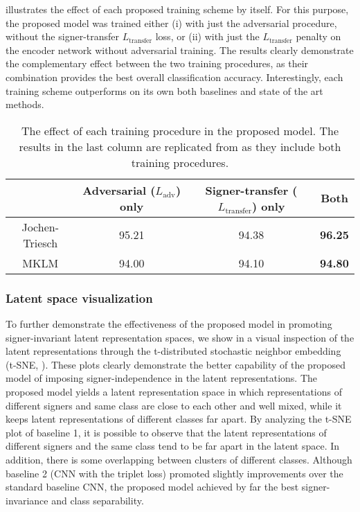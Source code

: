  illustrates the effect of each proposed training scheme by itself. For this purpose, the proposed model was trained either (i) with just the adversarial procedure, without the signer-transfer $L_{\text{transfer}}$ loss, or (ii) with just the $L_{\text{transfer}}$ penalty on the encoder network without adversarial training. The results clearly demonstrate the complementary effect between the two training procedures, as their combination provides the best overall classification accuracy. Interestingly, each training scheme outperforms on its own both baselines and state of the art methods.

\begin{table}[t]
    \centering
    \begin{small}
        \begin{tabular}{c|c c : c }
            & Adversarial ($L_{\text{adv}}$) only  & Signer-transfer ($L_{\text{transfer}}$) only & Both \\ \hline
            Jochen-Triesch                              & 95.21            & 94.38                & \textbf{96.25}        \\
            MKLM            & 94.00            & 94.10                & \textbf{94.80}
        \end{tabular}
    \end{small}
    \caption{\centering The effect of each training procedure in the proposed model. The results in the last column are replicated from  as they include both training procedures.}
    \label{tab:loss_terms}
\end{table}

\subsubsection{Latent space visualization}
To further demonstrate the effectiveness of the proposed model in promoting signer-invariant latent representation spaces, we show in  a visual inspection of the latent representations through the t-distributed stochastic neighbor embedding (t-SNE, \citet{Maaten2008}). These plots clearly demonstrate the better capability of the proposed model of imposing signer-independence in the latent representations. The proposed model yields a latent representation space in which representations of different signers and same class are close to each other and well mixed, while it keeps latent representations of different classes far apart. By analyzing the t-SNE plot of baseline 1, it is possible to observe that the latent representations of different signers and the same class tend to be far apart in the latent space. In addition, there is some overlapping between clusters of different classes. Although baseline 2 (CNN with the triplet loss) promoted slightly improvements over the standard baseline CNN, the proposed model achieved by far the best signer-invariance and class separability.

